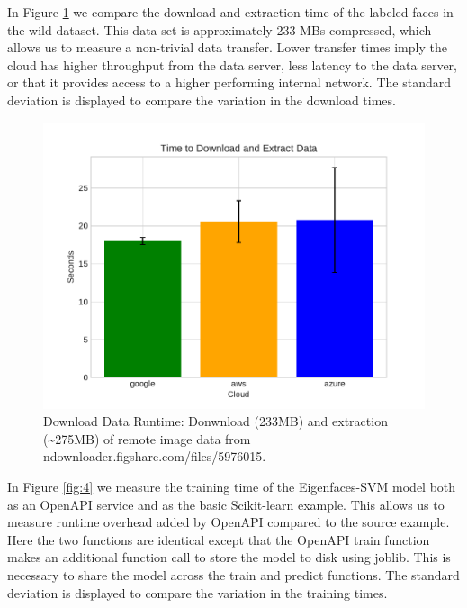 In Figure \ref{fig:3} we compare the download and extraction time of the labeled
faces in the wild dataset. This data set is approximately 233 MBs
compressed, which allows us to measure a non-trivial data transfer.
Lower transfer times imply the cloud has higher throughput from the data
server, less latency to the data server, or that it provides access to a
higher performing internal network. The standard deviation is displayed
to compare the variation in the download times.

\begin{figure}
\centering

\includegraphics[width=\columnwidth]{images/sample_graph_1.pdf}

\caption{Download Data Runtime:  Donwnload (233MB) and extraction
(\textasciitilde 275MB) of remote image data from
ndownloader.figshare.com/files/5976015.}
\label{fig:3}
\end{figure}

In Figure \ref{fig:4} we measure the training time of the Eigenfaces-SVM model
both as an OpenAPI service and as the basic Scikit-learn example. This
allows us to measure runtime overhead added by OpenAPI compared to the
source example. Here the two functions are identical except that the
OpenAPI train function makes an additional function call to store the
model to disk using joblib. This is necessary to share the model across
the train and predict functions. The standard deviation is displayed to
compare the variation in the training times.

